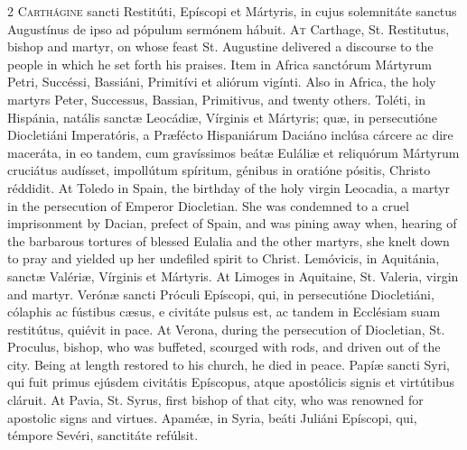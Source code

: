 \begin{paracol}{2}
\lettrine[lines=2]{C}{arthágine} sancti 
 Restitúti, Epíscopi et Mártyris, in cujus solemnitáte sanctus Augustínus de 
 ipso ad pópulum sermónem hábuit.
\switchcolumn
{}
\lettrine[lines=2]{A}{t} Carthage, St. Restitutus, bishop 
 and martyr, on whose feast St. Augustine delivered a discourse to the people 
 in which he set forth his praises.
\switchcolumn*
{}
Item in Africa 
 sanctórum Mártyrum Petri, Succéssi, Bassiáni, Primitívi et aliórum vigínti.
\switchcolumn
{}
Also in Africa, the holy martyrs 
 Peter, Successus, Bassian, Primitivus, and twenty others.
\switchcolumn*
{}
Toléti, in Hispánia, 
 natális sanctæ Leocádiæ, Vírginis et Mártyris; quæ, in persecutióne 
 Diocletiáni Imperatóris, a Præfécto Hispaniárum Daciáno inclúsa cárcere ac 
 dire maceráta, in eo tandem, cum gravíssimos beátæ Euláliæ et reliquórum 
 Mártyrum cruciátus audísset, impollútum spíritum, génibus in oratióne 
 pósitis, Christo réddidit.
\switchcolumn
{}
At Toledo in Spain, the birthday of 
 the holy virgin Leocadia, a martyr in the persecution of Emperor Diocletian. 
 She was condemned to a cruel imprisonment by Dacian, prefect of Spain, and 
 was pining away when, hearing of the barbarous tortures of blessed Eulalia 
 and the other martyrs, she knelt down to pray and yielded up her undefiled 
 spirit to Christ.
\switchcolumn*
{}
Lemóvicis, in Aquitánia, sanctæ Valériæ, Vírginis et Mártyris.
\switchcolumn
{}
At Limoges in Aquitaine, St. 
 Valeria, virgin and martyr.
\switchcolumn*
{}
Verónæ sancti Próculi 
 Epíscopi, qui, in persecutióne Diocletiáni, cólaphis ac fústibus cæsus, e 
 civitáte pulsus est, ac tandem in Ecclésiam suam restitútus, quiévit in 
 pace.
\switchcolumn
{}
At Verona, during the persecution of 
 Diocletian, St. Proculus, bishop, who was buffeted, scourged with rods, and 
 driven out of the city. Being at length restored to his church, he 
 died in peace.
\switchcolumn*
{}
Papíæ sancti Syri, qui 
 fuit primus ejúsdem civitátis Epíscopus, atque apostólicis signis et 
 virtútibus cláruit.
\switchcolumn
{}
At Pavia, St. Syrus, first bishop of 
 that city, who was renowned for apostolic signs and virtues.
\switchcolumn*
{}
Apaméæ, in Syria, beáti 
 Juliáni Epíscopi, qui, témpore Sevéri, sanctitáte refúlsit.
\switchcolumn
{}

\end{paracol}
